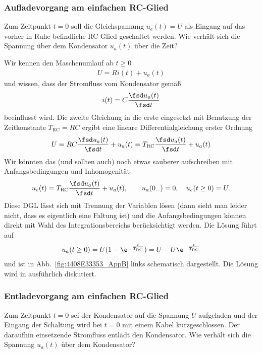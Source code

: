 \subsubsection*{Aufladevorgang am einfachen RC-Glied}

Zum Zeitpunkt $t=0$ soll die Gleichspannung $u_e(t) = U$ als Eingang auf das vorher in
Ruhe befindliche RC Glied geschaltet werden.
%
Wie verhält sich die Spannung über dem Kondensator $u_a(t)$ über die Zeit?

Wir kennen den Maschenumlauf ab $t\geq 0$
\begin{align}
U = R i(t) + u_a(t)
\end{align}
und wissen, dass der Stromfluss vom Kondensator gemäß
\begin{align}
i(t) = C \frac{\fsd u_a(t)}{\fsd t}
\end{align}
beeinflusst wird.
Die zweite Gleichung in die erste eingesetzt mit Benutzung der Zeitkonstante
$T_\text{RC} = R C$ ergibt eine lineare Differentialgleichung erster Ordnung
\begin{align}
U = R C \frac{\fsd u_a(t)}{\fsd t} + u_a(t) =
T_\text{RC} \frac{\fsd u_a(t)}{\fsd t} + u_a(t)
\end{align}
Wir könnten das (und sollten auch) noch etwas sauberer aufschreiben mit Anfangsbedingungen
und Inhomogenität
\begin{align}
u_e(t) = T_\text{RC} \frac{\fsd u_a(t)}{\fsd t} + u_a(t),
\qquad u_a(0_-)=0,\quad u_e(t\geq 0) = U.
\end{align}
Diese DGL lässt sich mit Trennung der Variablen lösen (dann sieht man leider nicht, dass es eigentlich eine Faltung ist) und die Anfangsbedingungen
können direkt mit Wahl des Integrationsbereichs berücksichtigt werden.
%
Die Lösung führt auf
\begin{align}
u_a(t \geq 0) = U(1-\e^{-\frac{t}{T_\text{RC}}}) = U - U\e^{-\frac{t}{T_\text{RC}}}
\end{align}
und ist in Abb.~\ref{fig:4408E33353_AppB} links schematisch dargestellt.
%
Die Lösung wird in \cite[Lap. 15.4.4]{Marinescu2020} ausführlich diskutiert.

\subsubsection*{Entladevorgang am einfachen RC-Glied}

Zum Zeitpunkt $t=0$ sei der Kondensator auf die Spannung $U$ aufgeladen und
der Eingang der Schaltung wird bei $t=0$ mit einem Kabel kurzgeschlossen.
Der daraufhin einsetzende Stromfluss entlädt den Kondensator.
Wie verhält sich die Spannung $u_a(t)$ über dem Kondensator?

